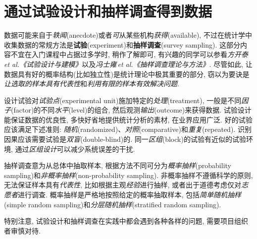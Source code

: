 \section{通过试验设计和抽样调查得到数据}
数据可能来自于\emph{轶闻}(anecdote)或者\emph{可}从某些机构\emph{获得}(available), 不过在统计学中收集数据的常规方法是\textbf{试验}(experiment)和\textbf{抽样调查}(survey sampling). 这部分内容不宜在入门课程中占据过多学时, 稍作了解即可, 有兴趣的同学可以参看\emph{方开泰\,et al.《试验设计与建模》}以及\emph{冯士雍\,et al.《抽样调查理论与方法》}. 尽管如此, 让数据具有好的概率结构(比如独立性)是统计理论中极其重要的部分, 窃以为要诀是\emph{让选取的样本具有代表性}和\emph{利用有限的样本有效解决问题}.

设计试验对\emph{试验点}(experimental unit)施加特定的\emph{处理}(treatment), 一般是不同\emph{因子}(factor)的不同\emph{水平}(level)的组合, 然后观测\emph{输出}(outcome)来获得数据. 试验设计能保证数据的优良性, 多快好省地提供统计分析的素材, 在业界应用广泛. 好的试验应该满足下述准则: \emph{随机}(randomized)、\emph{对照}(comparative)和\emph{重复}(repeated). 识别因果应该需要试验是\emph{双盲}(double-blind)的. 同一\emph{区组}(block)的试验有近似的试验环境, 通过\emph{区组设计}可以减少系统误差的干扰.

抽样调查意为从总体中抽取样本, 根据方法不同可分为\emph{概率抽样}(probability sampling)和\emph{非概率抽样}(non-probability sampling). 非概率抽样不遵循科学的原则, 无法保证样本具有\emph{代表性}, 比如根据主观\emph{经验}进行抽样, 或者出于道德考虑仅对\emph{志愿者}进行调查. 概率抽样是严格地按照给定的概率抽取样本, 包括\emph{简单随机抽样}(simple random sampling)和\emph{分层随机抽样}(stratified random sampling).

特别注意, 试验设计和抽样调查在实践中都会遇到各种各样的问题, 需要项目组织者审慎对待.